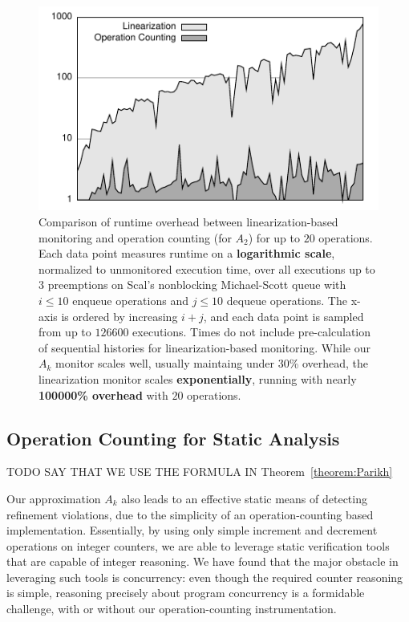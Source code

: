 \begin{figure}[t]
  \centering
  \includegraphics[width=\linewidth]{figures/lin-vs-counting-time}
  \caption{Comparison of runtime overhead between linearization-based monitoring
    and operation counting (for $A_2$) for up to $20$ operations. Each data
    point measures runtime on a \textbf{logarithmic scale}, normalized to
    unmonitored execution time, over all executions up to $3$ preemptions on
    Scal's nonblocking Michael-Scott queue with $i\!\le\!10$ enqueue operations
    and $j\!\le\!10$ dequeue operations. The x-axis is ordered by increasing
    $i\!+\!j$, and each data point is sampled from up to $126600$ executions.
    Times do not include pre-calculation of sequential histories for
    linearization-based monitoring. While our $A_k$ monitor scales well,
    usually maintaing under 30\% overhead, the linearization monitor scales
    \textbf{exponentially}, running with nearly \textbf{100000\% overhead}
    with $20$ operations.
  }
  \label{fig:data:runtime}
  \vspace{-3mm}
\end{figure}

\subsection{Operation Counting for Static Analysis}
\label{sec:exp:static}

TODO SAY THAT WE USE THE FORMULA IN Theorem~\ref{theorem:Parikh}

Our approximation $A_k$ also leads to an effective static means of detecting
refinement violations, due to the simplicity of an operation-counting based
implementation. Essentially, by using only simple increment and decrement
operations on integer counters, we are able to leverage static verification
tools that are capable of integer reasoning. We have found that the major
obstacle in leveraging such tools is concurrency: even though the required
counter reasoning is simple, reasoning precisely about program concurrency is a
formidable challenge, with or without our operation-counting instrumentation.

